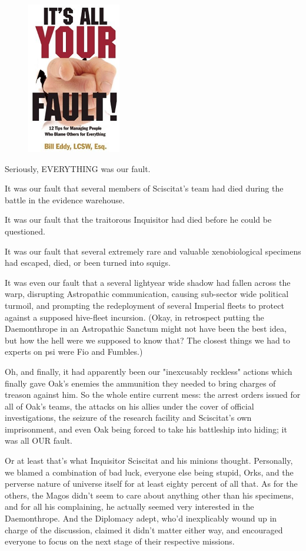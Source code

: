 \begin{figure}
	\begin{center}
		\includegraphics[width=\figwidth]{pics/17/6.png}
	\end{center}
\end{figure}
Seriously, EVERYTHING was our fault.

It was our fault that several members of Sciscitat's team had died during the battle in the evidence warehouse.

It was our fault that the traitorous Inquisitor had died before he could be questioned.

It was our fault that several extremely rare and valuable xenobiological specimens had escaped, died, or been turned into squigs.

It was even our fault that a several lightyear wide shadow had fallen across the warp, disrupting Astropathic communication, causing sub-sector wide political turmoil, and prompting the redeployment of several Imperial fleets to protect against a supposed hive-fleet incursion. 
(Okay, in retrospect putting the Daemonthrope in an Astropathic Sanctum might not have been the best idea, but how the hell were we supposed to know that? 
The closest things we had to experts on psi were Fio and Fumbles.)

Oh, and finally, it had apparently been our "inexcusably reckless" actions which finally gave Oak's enemies the ammunition they needed to bring charges of treason against him. 
So the whole entire current mess: 
the arrest orders issued for all of Oak's teams, the attacks on his allies under the cover of official investigations, the seizure of the research facility and Sciscitat's own imprisonment, and even Oak being forced to take his battleship into hiding; 
it was all OUR fault.

Or at least that's what Inquisitor Sciscitat and his minions thought. 
Personally, we blamed a combination of bad luck, everyone else being stupid, Orks, and the perverse nature of universe itself for at least eighty percent of all that. 
As for the others, the Magos didn't seem to care about anything other than his specimens, and for all his complaining, he actually seemed very interested in the Daemonthrope. 
And the Diplomacy adept, who'd inexplicably wound up in charge of the discussion, claimed it didn't matter either way, and encouraged everyone to focus on the next stage of their respective missions.

